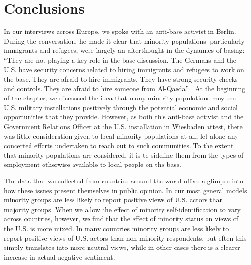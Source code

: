 \section*{Conclusions}

In our interviews across Europe, we spoke with an anti-base activist in Berlin. During the conversation, he made it clear that minority populations, particularly immigrants and refugees, were largely an afterthought in the dynamics of basing: ``They are not playing a key role in the base discussion. The Germans and the U.S. have security concerns related to hiring immigrants and refugees to work on the base. They are afraid to hire immigrants. They have strong security checks and controls. They are afraid to hire someone from Al-Qaeda'' \cite{berlinone20190723}. At the beginning of the chapter, we discussed the idea that many minority populations may see U.S. military installations positively through the potential economic and social opportunities that they provide. However, as both this anti-base activist and the Government Relations Officer at the U.S. installation in Wiesbaden attest, there was little consideration given to local minority populations at all, let alone any concerted efforts undertaken to reach out to such communities. To the extent that minority populations are considered, it is to sideline them from the types of employment otherwise available to local people on the base. 

The data that we collected from countries around the world offers a glimpse into how these issues present themselves in public opinion. In our most general models minority groups are less likely to report positive views of U.S. actors than majority groups. When we allow the effect of minority self-identification to vary across countries, however, we find that the effect of minority status on views of the U.S. is more mixed. In many countries minority groups are less likely to report positive views of U.S. actors than non-minority respondents, but often this simply translates into more neutral views, while in other cases there is a clearer increase in actual negative sentiment.

